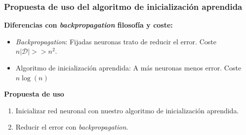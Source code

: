 \documentclass{beamer}
\begin{document}
\begin{frame}
    \frametitle{Propuesta de uso del algoritmo de inicialización aprendida}

    \textbf{Diferencias con \textit{backpropagation} filosofía y coste:}
    \begin{itemize}
        \item \textit{Backpropagation}: Fijadas neuronas trato de reducir el error. Coste  $n |\mathcal{D}| >> n^2$.
        \item Algoritmo de inicialización aprendida: A más neuronas menos error. Coste  $n\log(n)$
    \end{itemize}
\textbf{Propuesta de uso}
    \begin{enumerate}
        \item Inicializar red neuronal con nuestro algoritmo de inicialización aprendida. 
        \item Reducir el error con \textit{backpropagation}. 
    \end{enumerate}

\end{frame}

\end{document}
